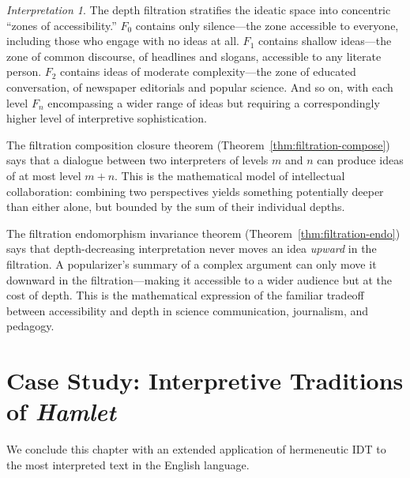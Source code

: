 \documentclass[11pt,openany]{book}
\theoremstyle{definition}
\theoremstyle{plain}
\theoremstyle{remark}
\newtheorem{interpretation}[axiom]{Interpretation}
\begin{document}
\begin{interpretation}
The depth filtration stratifies the ideatic space into concentric ``zones of accessibility.'' $F_0$ contains only silence---the zone accessible to everyone, including those who engage with no ideas at all. $F_1$ contains shallow ideas---the zone of common discourse, of headlines and slogans, accessible to any literate person. $F_2$ contains ideas of moderate complexity---the zone of educated conversation, of newspaper editorials and popular science. And so on, with each level $F_n$ encompassing a wider range of ideas but requiring a correspondingly higher level of interpretive sophistication.

The filtration composition closure theorem (Theorem~\ref{thm:filtration-compose}) says that a dialogue between two interpreters of levels $m$ and $n$ can produce ideas of at most level $m + n$. This is the mathematical model of intellectual collaboration: combining two perspectives yields something potentially deeper than either alone, but bounded by the sum of their individual depths.

The filtration endomorphism invariance theorem (Theorem~\ref{thm:filtration-endo}) says that depth-decreasing interpretation never moves an idea \emph{upward} in the filtration. A popularizer's summary of a complex argument can only move it downward in the filtration---making it accessible to a wider audience but at the cost of depth. This is the mathematical expression of the familiar tradeoff between accessibility and depth in science communication, journalism, and pedagogy.
\end{interpretation}

\section{Case Study: Interpretive Traditions of \emph{Hamlet}}

We conclude this chapter with an extended application of hermeneutic IDT to the most interpreted text in the English language.
\end{document}
